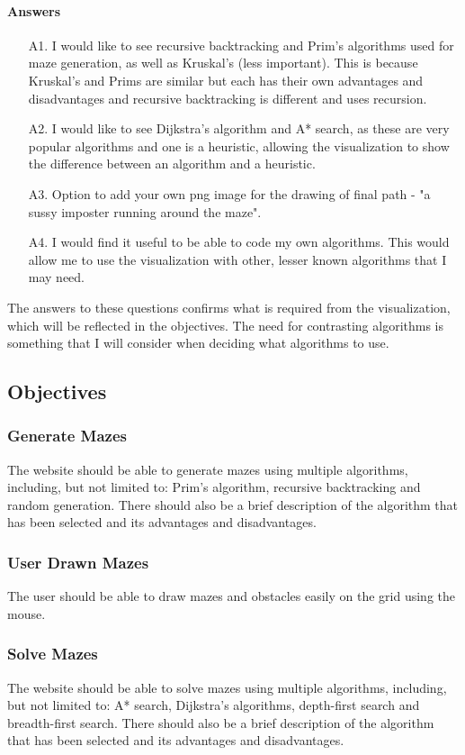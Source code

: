 \documentclass{article}
\begin{document}
\paragraph*{Answers}
\begin{enumerate}
    \item[A1.]I would like to see recursive backtracking and Prim's algorithms used for maze generation, as well as Kruskal's (less important). This is because Kruskal's and Prims are similar but each has their own advantages and disadvantages and recursive backtracking is different and uses recursion.
    \item[A2.]I would like to see Dijkstra's algorithm and A* search, as these are very popular algorithms and one is a heuristic, allowing the visualization to show the difference between an algorithm and a heuristic.
    \item[A3.]Option to add your own png image for the drawing of final path - "a sussy imposter running around the maze".
    \item[A4.]I would find it useful to be able to code my own algorithms. This would allow me to use the visualization with other, lesser known algorithms that I may need.
\end{enumerate}
The answers to these questions confirms what is required from the visualization, which will be reflected in the objectives. The need for contrasting algorithms is something that I will consider when deciding what algorithms to use.
\subsection{Objectives}
\subsubsection{Generate Mazes}
The website should be able to generate mazes using multiple algorithms, including, but not limited to: Prim's algorithm, recursive backtracking and random generation. There should also be a brief description of the algorithm that has been selected and its advantages and disadvantages.

\subsubsection{User Drawn Mazes}
The user should be able to draw mazes and obstacles easily on the grid using the mouse.

\subsubsection{Solve Mazes}
The website should be able to solve mazes using multiple algorithms, including, but not limited to: A* search, Dijkstra's algorithms, depth-first search and breadth-first search. There should also be a brief description of the algorithm that has been selected and its advantages and disadvantages.
\end{document}
